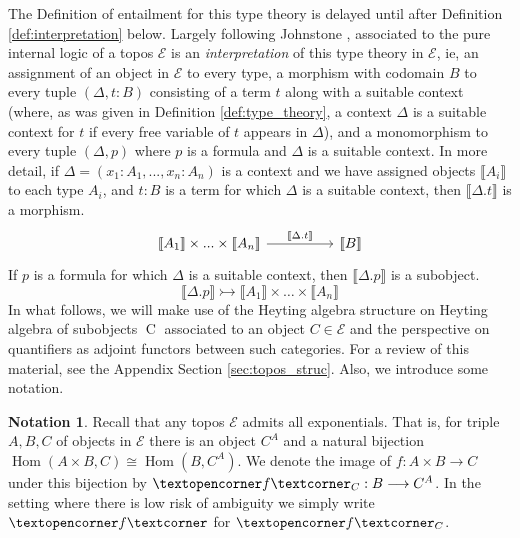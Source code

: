 \documentclass{birkjour}
\theoremstyle{plain}
\theoremstyle{definition}
\newtheorem{notation}[thm]{Notation}
\newcommand{\call}[1]{\mathcal{#1}}
\newcommand{\adj}[1]{\text{\textopencorner}{#1}\text{\textcorner}}
\newcommand{\lto}{\longrightarrow}
\begin{document}
	The Definition of entailment for this type theory is delayed until after Definition \ref{def:interpretation} below.
	Largely following Johnstone \cite[\S D4.1]{Johnstone}, associated to the pure internal logic of a topos $\call{E}$ is an \emph{interpretation} of this type theory in $\call{E}$, ie, an assignment of an object in $\call{E}$ to every type, a morphism with codomain $B$ to every tuple $(\Delta,t:B)$ consisting of a term $t$ along with a suitable context (where, as was given in Definition \ref{def:type_theory}, a context $\Delta$  is a suitable context for $t$ if every free variable of $t$ appears in $\Delta$), and a monomorphism to every tuple $(\Delta, p)$ where $p$ is a formula and $\Delta$ is a suitable context. In more detail, if $\Delta = (x_1:A_1,...,x_n:A_n)$ is a context and we have assigned objects $\llbracket A_i\rrbracket$ to each type $A_i$, and $t:B$ is a term for which $\Delta$ is a suitable context, then $\llbracket \Delta . t \rrbracket$ is a morphism.
	\[
	\begin{tikzcd}[column sep = huge]
		\llbracket A_1 \rrbracket \times ... \times \llbracket A_n \rrbracket\arrow[r,"{\llbracket \Delta . t\rrbracket}"] & \llbracket B \rrbracket
	\end{tikzcd}
	\]
	If $p$ is a formula for which $\Delta$ is a suitable context, then $\llbracket \Delta . p \rrbracket$ is a subobject.
	\begin{equation}
		\llbracket \Delta. p \rrbracket \rightarrowtail \llbracket A_1 \rrbracket \times \hdots \times \llbracket A_n \rrbracket
	\end{equation}
	In what follows, we will make use of the Heyting algebra structure on Heyting algebra of subobjects $\operatorname{C}$ associated to an object $C \in \call{E}$ and the perspective on quantifiers as adjoint functors between such categories. For a review of this material, see the Appendix Section \ref{sec:topos_struc}. Also, we introduce some notation.
	\begin{notation}\label{not:adj}
		Recall that any topos $\call{E}$ admits all exponentials. That is, for triple $A,B,C$ of objects in $\call{E}$ there is an object $C^A$ and a natural bijection $\operatorname{Hom}(A \times B, C) \cong \operatorname{Hom}(B,C^A)$. We denote the image of $f:A \times B \lto C$ under this bijection by $\adj{f}_C: B \lto C^A$. In the setting where there is low risk of ambiguity we simply write $\adj{f}$ for $\adj{f}_C$.
	\end{notation}
\end{document}

